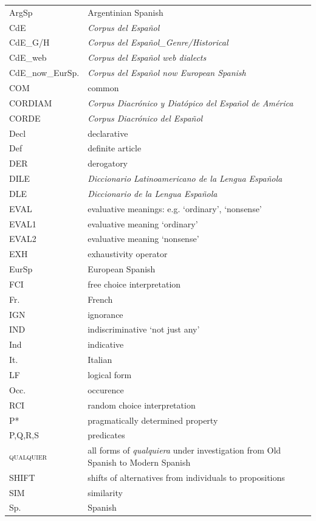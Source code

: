 \addchap{\lsAbbreviationsTitle}
\begin{tabularx}{\textwidth}{lQ}
ArgSp  & Argentinian Spanish\\
CdE &   \textit{Corpus del Español}\\
CdE\_G/H  &\textit{Corpus del Español\_Genre/Historical}\\
CdE\_web &\textit{Corpus del Español web dialects}\\
CdE\_now\_EurSp. & \textit{Corpus del Español now European Spanish}\\
COM & common\\
CORDIAM & \textit{Corpus Diacrónico y Diatópico del Español de América}\\
CORDE & \textit{Corpus Diacrónico del Español}\\
Decl &  declarative\\
Def &  definite article\\
DER &   derogatory\\
DILE & \textit{Diccionario Latinoamericano de la Lengua Española}\\
DLE &  \textit{Diccionario de la Lengua Española}\\
EVAL & evaluative meanings: e.g. ‘ordinary’, ‘nonsense’\\
EVAL1 & evaluative meaning ‘ordinary’\\
EVAL2 & evaluative meaning ‘nonsense’\\
EXH &   exhaustivity operator\\
EurSp & European Spanish\\
FCI &   free choice interpretation\\
Fr. &  French\\
IGN &  ignorance\\
IND &  indiscriminative ‘not just any’\\
Ind &  indicative\\
It. &  Italian\\
LF &  logical form\\
Occ. &  occurence\\
RCI &  random choice interpretation\\
P* &   pragmatically determined property\\
P,Q,R,S & predicates\\
\textsc{qualquier} & all forms of \textit{qualquiera} under investigation from Old Spanish to Modern Spanish\\
SHIFT & shifts of alternatives from individuals to propositions\\
SIM &   similarity\\
Sp. &  Spanish\\
\end{tabularx}

